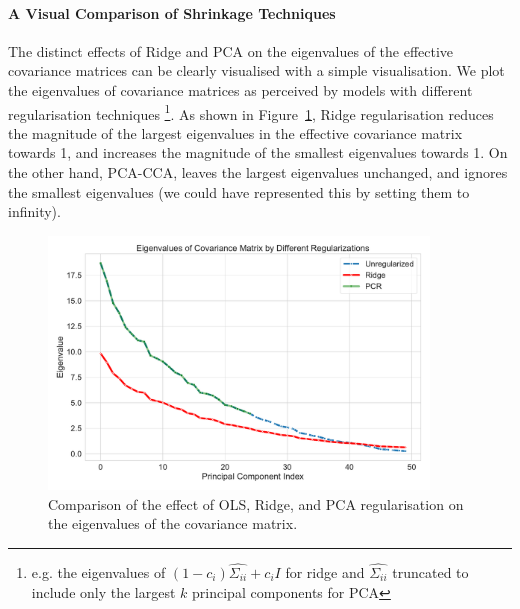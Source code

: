 \paragraph{}

\paragraph{A Visual Comparison of Shrinkage Techniques}

The distinct effects of Ridge and PCA on the eigenvalues of the effective covariance matrices can be clearly visualised with a simple visualisation.
We plot the eigenvalues of covariance matrices as perceived by models with different regularisation techniques \footnote{e.g. the eigenvalues of $(1 - c_i) \hat{\Sigma_{ii}} + c_i I$ for ridge and $\hat{\Sigma_{ii}}$ truncated to include only the largest $k$ principal components for PCA}.
As shown in Figure~\ref{fig:shrinkage}, Ridge regularisation reduces the magnitude of the largest eigenvalues in the effective covariance matrix towards 1, and increases the magnitude of the smallest eigenvalues towards 1.
On the other hand, PCA-CCA, leaves the largest eigenvalues unchanged, and ignores the smallest eigenvalues (we could have represented this by setting them to infinity).

\begin{figure}[h]
    \centering
    \includegraphics[width=0.9\textwidth]{figures/shrinkage/shrinkage}
    \caption{Comparison of the effect of OLS, Ridge, and PCA regularisation on the eigenvalues of the covariance matrix.}\label{fig:shrinkage}
\end{figure}

